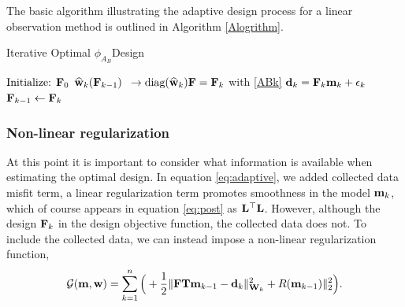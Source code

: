 \documentclass[12pt]{article}
\newcommand{\bfF}	{{\bf{F}}}
\newcommand{\bfL}	{{\bf{L}}}
\newcommand{\bfT}	{{\bf{T}}}
\newcommand{\bfW}	{{\bf{W}}}
\newcommand{\bfd}	{{\bf{d}}}
\newcommand{\bfm}	{{\bf{m}}}
\newcommand{\bfw}	{{\bf{w}}}
\newcommand{\hf}        {{\frac 12}}
\renewcommand{\hf}		 {\frac12}
\newcommand{\bfwhat}	{\widehat{\bf w}}
\begin{document}
The basic algorithm illustrating the adaptive design process for a linear observation method is outlined in Algorithm \ref{Alogrithm}. 
\begin{algorithm}
\caption{Iterative Optimal $\phi_{A_{B}}$Design}\label{Alogrithm}
\begin{algorithmic}[1]
%
\State $\text{Initialize: }\bfF_{0}$
%
%
\State $\bfwhat_k(\bfF_{k-1})$  $\ \to \text{diag}(\bfwhat_k)\bfF = \bfF_k $  with \ref{ABk}
%
\State $\bfd_k = \bfF_k \bfm_k + \epsilon_k$
%
\State $\bfF_{k-1} \leftarrow \bfF_k$
\EndFor
\end{algorithmic}
\end{algorithm}

\bigskip
\subsubsection{Non-linear regularization}
At this point it is important to consider what information is available when estimating the optimal design. In equation \eqref{eq:adaptive}, we added  collected data misfit term,  a linear regularization term promotes smoothness in the model $\bfm_k$, which of course appears in equation \eqref{eq:post} as $\bfL^{\top}\bfL$. However, although the design $\bfF_k$ in the design objective function, the collected data does not.  To include the collected data, we can instead impose a non-linear regularization function,
\begin{equation}
\label{eq:adaptiveNon}
\mathcal{G}(\bfm,\bfw) = \sum_{k=1}^{n} \Big ( + \hf  \| \bfF \bfT\bfm_{k-1} - \bfd_{k} \|^2_{\bfW_{k}} + R(\bfm_{k-1}) \|^2_2\Big).
\end{equation}
\end{document}
